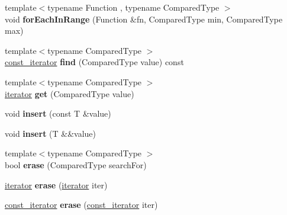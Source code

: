 \begin{DoxyCompactItemize}
\item 
\hypertarget{classbalanced__tree_aea7ca655e52a7301fe7d863f83923281}{{\footnotesize template$<$typename Function , typename Compared\+Type $>$ }\\void {\bfseries for\+Each\+In\+Range} (Function \&fn, Compared\+Type min, Compared\+Type max)}\label{classbalanced__tree_aea7ca655e52a7301fe7d863f83923281}

\item 
\hypertarget{classbalanced__tree_a74549f480c5b4563e8002383dd09c625}{{\footnotesize template$<$typename Compared\+Type $>$ }\\\hyperlink{classbalanced__tree_1_1const__iterator}{const\+\_\+iterator} {\bfseries find} (Compared\+Type value) const }\label{classbalanced__tree_a74549f480c5b4563e8002383dd09c625}

\item 
\hypertarget{classbalanced__tree_a59d406c09ba8e66d62ebaa28f82855de}{{\footnotesize template$<$typename Compared\+Type $>$ }\\\hyperlink{classbalanced__tree_1_1iterator}{iterator} {\bfseries get} (Compared\+Type value)}\label{classbalanced__tree_a59d406c09ba8e66d62ebaa28f82855de}

\item 
\hypertarget{classbalanced__tree_ae4575e8d7e09d0e9ac918838888b6026}{void {\bfseries insert} (const T \&value)}\label{classbalanced__tree_ae4575e8d7e09d0e9ac918838888b6026}

\item 
\hypertarget{classbalanced__tree_a818d0cab3415d578717fd3e003e0a79e}{void {\bfseries insert} (T \&\&value)}\label{classbalanced__tree_a818d0cab3415d578717fd3e003e0a79e}

\item 
\hypertarget{classbalanced__tree_aec6271142e60085c0075ab1a2e2f4880}{{\footnotesize template$<$typename Compared\+Type $>$ }\\bool {\bfseries erase} (Compared\+Type search\+For)}\label{classbalanced__tree_aec6271142e60085c0075ab1a2e2f4880}

\item 
\hypertarget{classbalanced__tree_a07af5bfc5725fb42094261bd52ce8970}{\hyperlink{classbalanced__tree_1_1iterator}{iterator} {\bfseries erase} (\hyperlink{classbalanced__tree_1_1iterator}{iterator} iter)}\label{classbalanced__tree_a07af5bfc5725fb42094261bd52ce8970}

\item 
\hypertarget{classbalanced__tree_af31130649d2d8535f00f171abc7c9605}{\hyperlink{classbalanced__tree_1_1const__iterator}{const\+\_\+iterator} {\bfseries erase} (\hyperlink{classbalanced__tree_1_1const__iterator}{const\+\_\+iterator} iter)}\label{classbalanced__tree_af31130649d2d8535f00f171abc7c9605}


\end{DoxyCompactItemize}
